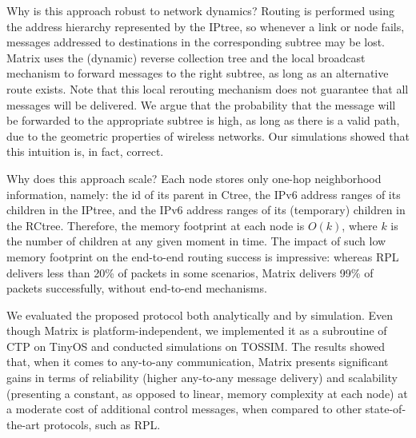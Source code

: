 Why is this approach robust to network dynamics? Routing is
performed using the address hierarchy represented by the IPtree, so
whenever a link or node fails, messages addressed to destinations in
the corresponding subtree may be lost. Matrix uses the (dynamic)
reverse collection tree and the local broadcast mechanism to forward
messages to the right subtree, as long as an alternative route
exists. Note that this local rerouting mechanism does not
guarantee that all messages will be delivered. We argue that the probability that the message
will be forwarded to the appropriate subtree is
high, as long as there is a valid path, due to the geometric properties of wireless
networks. Our simulations showed that this intuition is, in fact, correct. %


Why does this approach scale? Each node stores only one-hop
neighborhood information, namely: the id of its parent in Ctree, the
IPv6 address ranges of its children in the IPtree, and the IPv6
address ranges of its (temporary) children in the RCtree. Therefore,
the memory footprint at each node is $O(k)$, where $k$ is the number
of children at any given moment in time. The impact of such low
memory footprint on the end-to-end routing success is impressive:
whereas RPL delivers less than 20\% of packets in some
scenarios, Matrix delivers 99\% of packets
successfully, without end-to-end mechanisms.


We evaluated the
proposed protocol both analytically and by simulation. Even though Matrix is
platform-independent, we implemented it as a subroutine of CTP on TinyOS and conducted
simulations on TOSSIM.
The results showed that, when it comes to any-to-any communication, Matrix
presents significant gains in terms of reliability (higher any-to-any message
delivery) and scalability (presenting a
constant, as opposed to linear, memory complexity at each node) at a moderate
cost of additional control messages, when compared to other state-of-the-art
protocols, such as RPL. %


